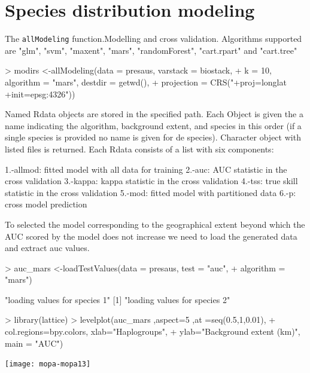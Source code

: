 \documentclass[10pt,a4paper]{report}
\begin{document}
\chapter{Species distribution modeling}


The \texttt{allModeling} function.Modelling and cross validation. Algorithms supported are "glm", "svm", "maxent", "mars", "randomForest", "cart.rpart" and "cart.tree"

\begin{Schunk}
\begin{Sinput}
> modirs <-allModeling(data = presaus, varstack = biostack, 
+               k = 10, algorithm = "mars", destdir = getwd(), 
+               projection = CRS("+proj=longlat +init=epsg:4326"))
\end{Sinput}
\end{Schunk}

Named Rdata objects are stored in the specified path. Each Object is given the a name indicating the algorithm, background extent, and species in this order (if a single species is provided no name is given for de species). Character object with listed files is returned. Each Rdata consists of a list with six components:

	1.-allmod: fitted model with all data for training 
	2.-auc: AUC statistic in the cross validation
	3.-kappa: kappa statistic in the cross validation
	4.-tss: true skill statistic in the cross validation
	5.-mod: fitted model with partitioned data 
	6.-p: cross model prediction 


To selected the model corresponding to the geographical extent beyond which the AUC scored by the model does not increase we need to load the generated data and extract auc values.

\begin{Schunk}
\begin{Sinput}
> auc_mars <-loadTestValues(data = presaus, test = "auc", 
+                           algorithm = "mars")
\end{Sinput}
\begin{Soutput}
[1] "loading values for species 1"
[1] "loading values for species 2"
\end{Soutput}
\begin{Sinput}
> library(lattice)
> levelplot(auc_mars ,aspect=5 ,at =seq(0.5,1,0.01), 
+           col.regions=bpy.colors, xlab="Haplogroups", 
+           ylab="Background extent (km)", main = "AUC")
\end{Sinput}
\end{Schunk}
\texttt{[image: mopa-mopa13]}
\end{document}
